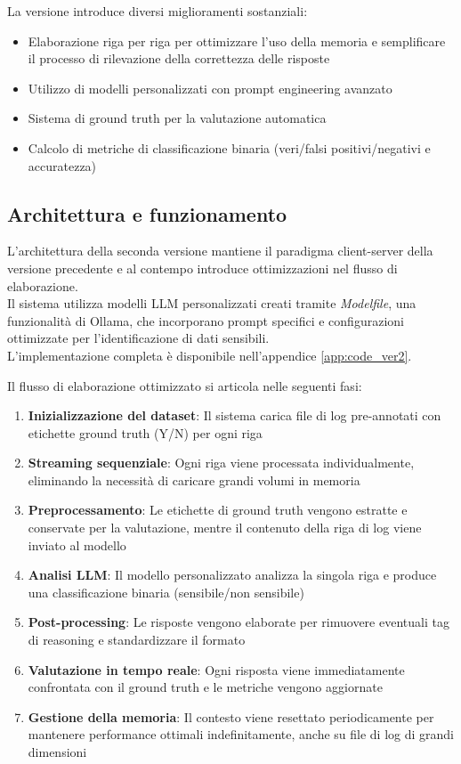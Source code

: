 \documentclass[12pt]{report}
\begin{document}
La versione introduce diversi miglioramenti sostanziali:
\begin{itemize}
    \item Elaborazione riga per riga per ottimizzare l'uso della memoria e semplificare il processo di rilevazione della correttezza delle risposte
    \item Utilizzo di modelli personalizzati con prompt engineering avanzato
    \item Sistema di ground truth per la valutazione automatica
    \item Calcolo di metriche di classificazione binaria (veri/falsi positivi/negativi e accuratezza)
\end{itemize}

\subsection{Architettura e funzionamento}
\label{subsec:ver2_architettura}

L'architettura della seconda versione mantiene il paradigma client-server della versione precedente e al contempo introduce ottimizzazioni nel flusso di elaborazione. \\
Il sistema utilizza modelli LLM personalizzati creati tramite \textit{Modelfile}, una funzionalità di Ollama, che incorporano prompt specifici e configurazioni ottimizzate per l'identificazione di dati sensibili.\\
L'implementazione completa è disponibile nell'appendice \ref{app:code_ver2}.

Il flusso di elaborazione ottimizzato si articola nelle seguenti fasi:

\begin{enumerate}
    \item \textbf{Inizializzazione del dataset}: Il sistema carica file di log pre-annotati con etichette ground truth (Y/N) per ogni riga
    \item \textbf{Streaming sequenziale}: Ogni riga viene processata individualmente, eliminando la necessità di caricare grandi volumi in memoria
    \item \textbf{Preprocessamento}: Le etichette di ground truth vengono estratte e conservate per la valutazione, mentre il contenuto della riga di log viene inviato al modello
    \item \textbf{Analisi LLM}: Il modello personalizzato analizza la singola riga e produce una classificazione binaria (sensibile/non sensibile)
    \item \textbf{Post-processing}: Le risposte vengono elaborate per rimuovere eventuali tag di reasoning e standardizzare il formato
    \item \textbf{Valutazione in tempo reale}: Ogni risposta viene immediatamente confrontata con il ground truth e le metriche vengono aggiornate
    \item \textbf{Gestione della memoria}: Il contesto viene resettato periodicamente per mantenere performance ottimali indefinitamente, anche su file di log di grandi dimensioni
\end{enumerate}
\end{document}
